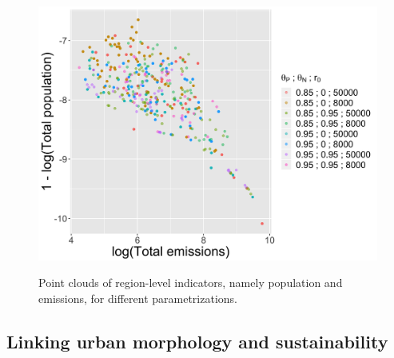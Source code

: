 \documentclass{jimis-en}
\begin{document}

\begin{figure}[ht] 
  {\includegraphics[width=\linewidth]{figures/full_effective_pareto.png}}
  \centering
  \label{fig:paretos}
  \caption{Point clouds of region-level indicators, namely population and emissions, for different parametrizations.}
\end{figure}










\subsection{Linking urban morphology and sustainability}


\end{document}
